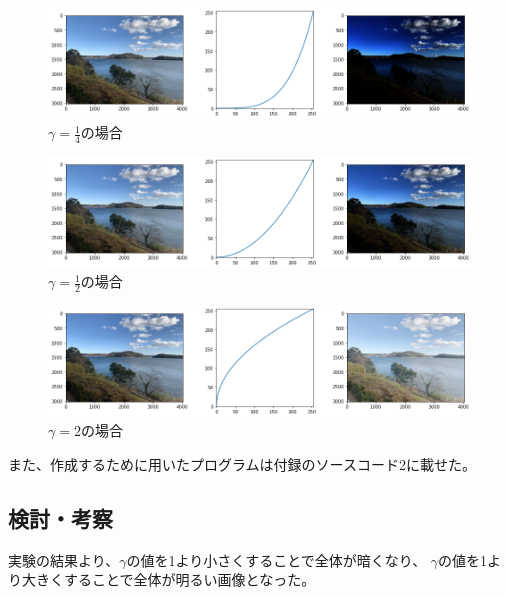 \documentclass[12pt]{jarticle}
\begin{document}
\begin{figure}[h]
    \begin{center}
        \includegraphics[scale=0.45]{kadai4_1_2.png}
    \end{center}
    \caption{$\gamma=\frac{1}{4}$の場合}
\end{figure}

\begin{figure}[h]
    \begin{center}
        \includegraphics[scale=0.45]{kadai4_1_3.png}
    \end{center}
    \caption{$\gamma=\frac{1}{2}$の場合}
\end{figure}

\clearpage

\begin{figure}[h]
    \begin{center}
        \includegraphics[scale=0.45]{kadai4_1_4.png}
    \end{center}
    \caption{$\gamma=2$の場合}
\end{figure}

また、作成するために用いたプログラムは付録のソースコード2に載せた。

\subsection{検討・考察}
実験の結果より、$\gamma$の値を1より小さくすることで全体が暗くなり、
$\gamma$の値を1より大きくすることで全体が明るい画像となった。
\end{document}
